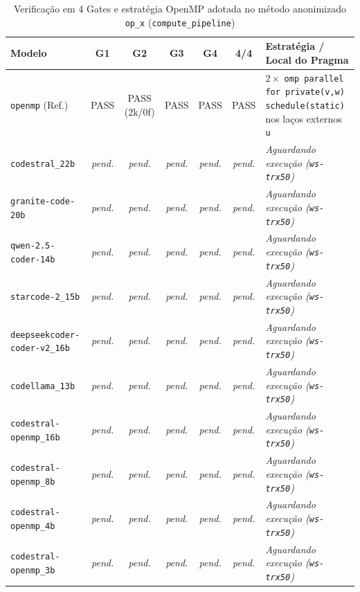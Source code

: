 \begin{table}[htbp]
\centering
\caption{Verificação em 4 Gates e estratégia OpenMP adotada no método anonimizado \texttt{op\_x} (\texttt{compute\_pipeline})}
\label{tab:anon_gates}
\small
\begin{tabular}{lccccc p{3.6cm}}
\toprule
\textbf{Modelo} & \textbf{G1} & \textbf{G2} & \textbf{G3} & \textbf{G4} & \textbf{4/4} & \textbf{Estratégia / Local do Pragma} \\
\midrule
\texttt{openmp} (Ref.) & PASS & PASS (2k/0f) & PASS & PASS & PASS & $2\times$ \texttt{omp parallel for private(v,w) schedule(static)} nos laços externos \texttt{u} \\
\midrule
\texttt{codestral\_22b} & \textit{pend.} & \textit{pend.} & \textit{pend.} & \textit{pend.} & \textit{pend.} & \textit{Aguardando execução (\texttt{ws-trx50})} \\
\texttt{granite-code-20b} & \textit{pend.} & \textit{pend.} & \textit{pend.} & \textit{pend.} & \textit{pend.} & \textit{Aguardando execução (\texttt{ws-trx50})} \\
\texttt{qwen-2.5-coder-14b} & \textit{pend.} & \textit{pend.} & \textit{pend.} & \textit{pend.} & \textit{pend.} & \textit{Aguardando execução (\texttt{ws-trx50})} \\
\texttt{starcode-2\_15b} & \textit{pend.} & \textit{pend.} & \textit{pend.} & \textit{pend.} & \textit{pend.} & \textit{Aguardando execução (\texttt{ws-trx50})} \\
\texttt{deepseekcoder-coder-v2\_16b} & \textit{pend.} & \textit{pend.} & \textit{pend.} & \textit{pend.} & \textit{pend.} & \textit{Aguardando execução (\texttt{ws-trx50})} \\
\texttt{codellama\_13b} & \textit{pend.} & \textit{pend.} & \textit{pend.} & \textit{pend.} & \textit{pend.} & \textit{Aguardando execução (\texttt{ws-trx50})} \\
\midrule
\texttt{codestral-openmp\_16b} & \textit{pend.} & \textit{pend.} & \textit{pend.} & \textit{pend.} & \textit{pend.} & \textit{Aguardando execução (\texttt{ws-trx50})} \\
\texttt{codestral-openmp\_8b} & \textit{pend.} & \textit{pend.} & \textit{pend.} & \textit{pend.} & \textit{pend.} & \textit{Aguardando execução (\texttt{ws-trx50})} \\
\texttt{codestral-openmp\_4b} & \textit{pend.} & \textit{pend.} & \textit{pend.} & \textit{pend.} & \textit{pend.} & \textit{Aguardando execução (\texttt{ws-trx50})} \\
\texttt{codestral-openmp\_3b} & \textit{pend.} & \textit{pend.} & \textit{pend.} & \textit{pend.} & \textit{pend.} & \textit{Aguardando execução (\texttt{ws-trx50})} \\
\bottomrule
\end{tabular}
\end{table}

